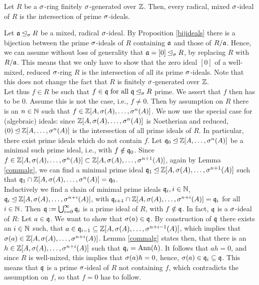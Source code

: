 \begin{prop}\label{mixedintersectionprimesfinite}
Let $R$ be a $\sigma$-ring finitely $\sigma$-generated over $\mathbb{Z}$. Then, every radical, mixed $\sigma$-ideal of $R$ is the intersection of prime $\sigma$-ideals.
\begin{bew}
Let $\mathfrak{a} \unlhd_{\sigma} R$ be a mixed, radical $\sigma$-ideal. By Proposition \ref{bijideals} there is a bijection between the prime $\sigma$-ideals of $R$ containing $\mathfrak{a}$ and those of $R/\mathfrak{a}$. Hence, we can assume without loss of generality that $\mathfrak{a} = [0] \unlhd_{\sigma} R$,
 by replacing $R$ with $R/\mathfrak{a}$. This means that we only have to show that the zero ideal $[0]$ of a well-mixed, reduced $\sigma$-ring $R$ is the intersection of all its prime $\sigma$-ideals. Note that this does not change the fact
that $R$ is finitely $\sigma$-generated over $\mathbb{Z}$. \\
\indent Let thus $f \in R$ be such that $f \in \mathfrak{q} \text{ for all } \mathfrak{q} \unlhd_{\sigma} R$ prime. We assert that $f$ then has to be $0$. Assume this is not the case, i.e., $f \neq 0$. Then by assumption on $R$ there is an $n \in \mathbb{N}$ such that $f \in \mathbb{Z}[A,\sigma(A),\ldots,\sigma^n(A)]$.
We now use the special case for (algebraic) ideals: since $\mathbb{Z}[A,\sigma(A),\ldots,\sigma^n(A)]$ is Noetherian and reduced, $(0) \unlhd \mathbb{Z}[A,\ldots,\sigma^n(A)]$ is the intersection of all prime ideals of $R$. In particular, there exist prime ideals which do not contain $f$.
Let $\mathfrak{q}_0 \unlhd \mathbb{Z}[A,\ldots,\sigma^n(A)]$ be a minimal such prime ideal, i.e., with $f \notin \mathfrak{q}_0$. Since $f \in \mathbb{Z}[A,\sigma(A),\ldots,\sigma^n(A)] \subset \mathbb{Z}[A,\sigma(A),\ldots,\sigma^{n+1}(A)]$, again by Lemma \ref{commalg}, we can find a minimal prime ideal $\mathfrak{q}_1 \unlhd \mathbb{Z}[A,\sigma(A),\ldots,\sigma^{n+1}(A)]$
such that $\mathfrak{q}_1 \cap \mathbb{Z}[A,\sigma(A),\ldots,\sigma^{n}(A)] = \mathfrak{q}_0$. \\
\indent Inductively we find a chain of minimal prime ideals $\mathfrak{q}_i, i \in \mathbb{N}$, $\mathfrak{q}_i \unlhd \mathbb{Z}[A,\sigma(A),\ldots,\sigma^{n+i}(A)]$, with $\mathfrak{q}_{i+1} \cap \mathbb{Z}[A,\sigma(A),\ldots,\sigma^{n+i}(A)] = \mathfrak{q}_i$ for all $i \in \mathbb{N}$.
Then $\mathfrak{q} := \bigcup_{i=0}^{\infty} \mathfrak{q}_i$ is a prime ideal of $R$, with $f \notin \mathfrak{q}$. In fact, $\mathfrak{q}$ is a $\sigma$-ideal of $R$: Let $a \in \mathfrak{q}$. We want to show that $\sigma(a) \in \mathfrak{q}$. By construction of $\mathfrak{q}$ there exists an $i \in \mathbb{N}$ such,
that $a \in \mathfrak{q}_{i-1} \subseteq \mathbb{Z}[A,\sigma(A),\ldots,\sigma^{n+i-1}(A)]$, which implies that $\sigma(a) \in \mathbb{Z}[A,\sigma(A),\ldots,\sigma^{n+i}(A)]$. Lemma \ref{commalg} states then, that there is an $h \in \mathbb{Z}[A,\sigma(A),\ldots,\sigma^{n+i}(A)]$ such that $ \mathfrak{q}_i = \text{Ann}(h)$.
It follows that $ah = 0$, and since $R$ is well-mixed, this implies that $\sigma(a)h = 0$, hence, $\sigma(a) \in \mathfrak{q}_i \subseteq \mathfrak{q}$. This means that $\mathfrak{q}$ is a prime $\sigma$-ideal of $R$ not containing $f$, which contradicts the assumption on $f$, so that $f = 0$ has to follow.
\end{bew}
\end{prop}

